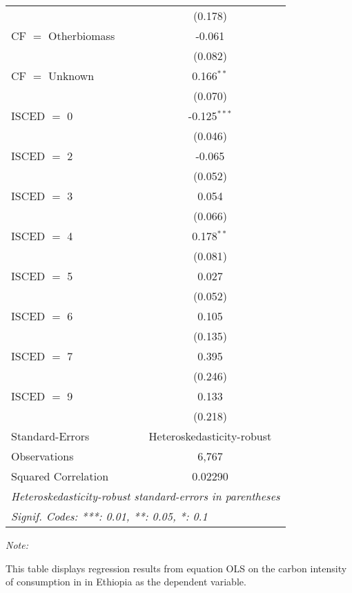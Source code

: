 \begin{table}[htbp!]
\begin{adjustbox}{width = 1\textwidth, max height = 0.95\textheight, center}
\begin{threeparttable}[b]
\begin{tabular}{lc}
                                & (0.178)\\   
            CF $=$ Otherbiomass & -0.061\\   
                                & (0.082)\\   
            CF $=$ Unknown      & 0.166$^{**}$\\   
                                & (0.070)\\   
            ISCED $=$ 0         & -0.125$^{***}$\\   
                                & (0.046)\\   
            ISCED $=$ 2         & -0.065\\   
                                & (0.052)\\   
            ISCED $=$ 3         & 0.054\\   
                                & (0.066)\\   
            ISCED $=$ 4         & 0.178$^{**}$\\   
                                & (0.081)\\   
            ISCED $=$ 5         & 0.027\\   
                                & (0.052)\\   
            ISCED $=$ 6         & 0.105\\   
                                & (0.135)\\   
            ISCED $=$ 7         & 0.395\\   
                                & (0.246)\\   
            ISCED $=$ 9         & 0.133\\   
                                & (0.218)\\   
            \midrule 
            Standard-Errors     & Heteroskedasticity-robust \\   
            Observations        & 6,767\\  
            Squared Correlation & 0.02290\\  
            \midrule \midrule
            \multicolumn{2}{l}{\emph{Heteroskedasticity-robust standard-errors in parentheses}}\\
            \multicolumn{2}{l}{\emph{Signif. Codes: ***: 0.01, **: 0.05, *: 0.1}}\\
         \end{tabular}
         
         \begin{tablenotes}\item \medskip \textit{Note:}
            \item This table displays regression results from equation OLS on the carbon intensity of consumption in  in Ethiopia as the dependent variable. 
         \end{tablenotes}
      \end{threeparttable}
   \end{adjustbox}
\end{table}


